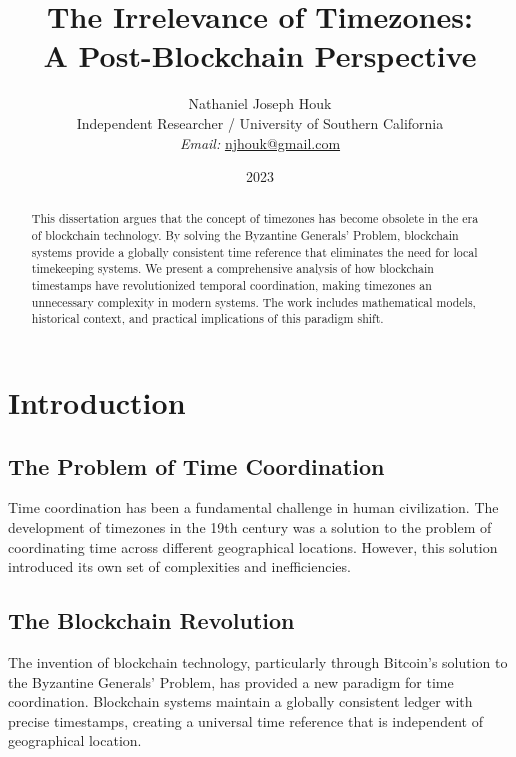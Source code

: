 \documentclass[12pt]{report}
\begin{document}
\title{The Irrelevance of Timezones: \\ A Post-Blockchain Perspective}

\author{Nathaniel Joseph Houk\\
Independent Researcher / University of Southern California\\
\textit{Email:} \href{mailto:njhouk@gmail.com}{njhouk@gmail.com}}
\date{2023}

\maketitle

\begin{abstract}
This dissertation argues that the concept of timezones has become obsolete in the era of blockchain technology. By solving the Byzantine Generals' Problem, blockchain systems provide a globally consistent time reference that eliminates the need for local timekeeping systems. We present a comprehensive analysis of how blockchain timestamps have revolutionized temporal coordination, making timezones an unnecessary complexity in modern systems. The work includes mathematical models, historical context, and practical implications of this paradigm shift.
\end{abstract}

\chapter{Introduction}

\section{The Problem of Time Coordination}
Time coordination has been a fundamental challenge in human civilization. The development of timezones in the 19th century was a solution to the problem of coordinating time across different geographical locations. However, this solution introduced its own set of complexities and inefficiencies.

\section{The Blockchain Revolution}
The invention of blockchain technology, particularly through Bitcoin's solution to the Byzantine Generals' Problem, has provided a new paradigm for time coordination. Blockchain systems maintain a globally consistent ledger with precise timestamps, creating a universal time reference that is independent of geographical location.
\end{document}
